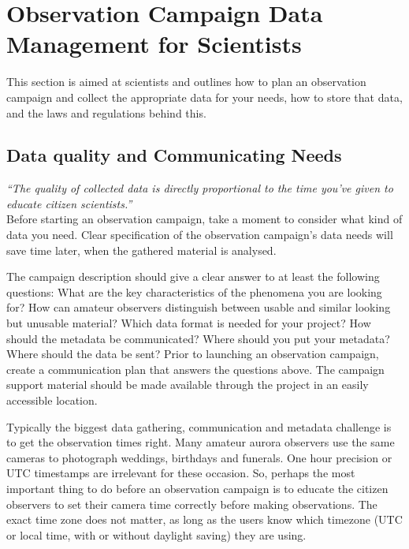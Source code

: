 \documentclass{article}
\newcommand{\contributed}[1]{%
    \par\noindent
    \begingroup
    \setlength{\leftskip}{1em}%
    \itshape
    Contributors: #1
    \par
    \endgroup
    \vspace{0.5em}
}
\begin{document}
\section{Observation Campaign Data Management for Scientists}\label{sec:data_sci}
This section is aimed at scientists and outlines how to plan an observation campaign and collect the appropriate data for your needs, how to store that data, and the laws and regulations behind this.

\subsection{Data quality and Communicating Needs}\label{sec:data_quality}

\textit{``The quality of collected data is directly proportional to the time you've given to educate citizen scientists.''}\\

Before starting an observation campaign, take a moment to consider what kind of data you need. Clear specification of the observation campaign's data needs will save time later, when the gathered material is analysed. 

The campaign description should give a clear answer to at least the following questions: What are the key characteristics of the phenomena you are looking for? How can amateur observers distinguish between usable and similar looking but unusable material? Which data format is needed for your project? How should the metadata be communicated? Where should you put your metadata? Where should the data be sent? Prior to launching an observation campaign, create a communication plan that answers the questions above. The campaign support material should be made available through the project in an easily accessible location.

Typically the biggest data gathering, communication and metadata challenge is to get the observation times right. Many amateur aurora observers use the same cameras to photograph weddings, birthdays and funerals. One hour precision or UTC timestamps are irrelevant for these occasion. So, perhaps the most important thing to do before an observation campaign is to educate the citizen observers to set their camera time correctly before making observations. The exact time zone does not matter, as long as the users know which timezone (UTC or local time, with or without daylight saving) they are using.
\end{document}
